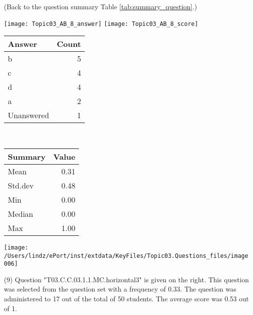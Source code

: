 \documentclass[12pt,english,nohyper]{tufte-handout}\usepackage[]{graphicx}\usepackage[]{color}
\begin{document}
 (Back to the question summary Table \ref{tab:summary_question}.)

\begin{center} \texttt{[image: Topic03\_AB\_8\_answer]} \texttt{[image: Topic03\_AB\_8\_score]} \end{center} 

\begin{center}%
\begin{tabular}{lr}
  \hline
Answer & Count \\ 
  \hline
b &   5 \\ 
  c &   4 \\ 
  d &   4 \\ 
  a &   2 \\ 
  Unanswered &   1 \\ 
   \hline
\end{tabular}
~~~~~~~~%
\begin{tabular}{lr}
  \hline
Summary & Value \\ 
  \hline
Mean & 0.31 \\ 
  Std.dev & 0.48 \\ 
  Min & 0.00 \\ 
  Median & 0.00 \\ 
  Max & 1.00 \\ 
   \hline
\end{tabular}
\end{center}\newpage{}



\vspace{5cm}\begin{marginfigure}\texttt{[image: /Users/lindz/ePort/inst/extdata/KeyFiles/Topic03.Questions\_files/image006]}\end{marginfigure}\vspace{-5cm} (9) Question "T03.C.C.03.1.1.MC.horizontal3" is given on the right. This question was selected from the question set with a frequency of 0.33. The question was administered to 17 out of the total of 50 students. The average score was 0.53 out of 1.
\end{document}
